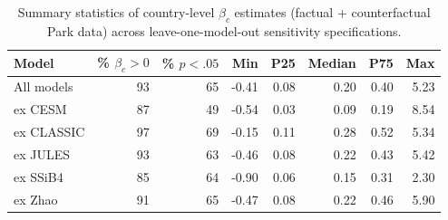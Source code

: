 \begin{table}[ht]
\centering
\caption{Summary statistics of country-level $\beta_c$ estimates (factual + counterfactual Park data) across leave-one-model-out sensitivity specifications.} 
\label{tab:beta_summary_fact_cfact}
\begin{tabular}{lrrrrrrr}
  \toprule
Model & \% $\beta_c > 0$ & \% $p < .05$ & Min & P25 & Median & P75 & Max \\ 
  \midrule
All models & 93 & 65 & -0.41 & 0.08 & 0.20 & 0.40 & 5.23 \\ 
  ex CESM & 87 & 49 & -0.54 & 0.03 & 0.09 & 0.19 & 8.54 \\ 
  ex CLASSIC & 97 & 69 & -0.15 & 0.11 & 0.28 & 0.52 & 5.34 \\ 
  ex JULES & 93 & 63 & -0.46 & 0.08 & 0.22 & 0.43 & 5.42 \\ 
  ex SSiB4 & 85 & 64 & -0.90 & 0.06 & 0.15 & 0.31 & 2.30 \\ 
  ex Zhao & 91 & 65 & -0.47 & 0.08 & 0.22 & 0.46 & 5.90 \\ 
   \bottomrule
\end{tabular}
\end{table}
